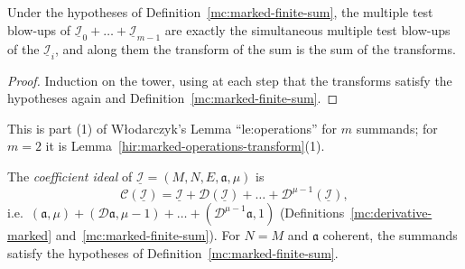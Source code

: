 \begin{lemma}
\label{mc:marked-finite-sum-tower}
\leanok
Under the hypotheses of Definition~\ref{mc:marked-finite-sum}, the multiple test blow-ups of \(\underline{\mathcal I}_0+\dots+\underline{\mathcal I}_{m-1}\) are exactly
the simultaneous multiple test blow-ups of the \(\underline{\mathcal I}_i\), and along them the transform of the sum is the sum of the transforms.
\end{lemma}
\begin{proof}
\leanok
Induction on the tower, using at each step that the transforms satisfy the hypotheses again and Definition~\ref{mc:marked-finite-sum}.
\end{proof}
This is part (1) of Włodarczyk's Lemma ``le:operations'' for \(m\) summands; for \(m=2\) it is Lemma~\ref{hir:marked-operations-transform}(1).

\begin{definition}
\label{mc:coefficient-ideal}
\leanok
The \emph{coefficient ideal} of \(\underline{\mathcal I}=(M,N,E,\mathfrak a,\mu)\) is
\[
 \mathcal C(\underline{\mathcal I})=\underline{\mathcal I}+\mathcal D(\underline{\mathcal I})+\dots+\mathcal D^{\mu-1}(\underline{\mathcal I}),
\]
i.e.\ \((\mathfrak a,\mu)+(\mathcal D\mathfrak a,\mu-1)+\dots+(\mathcal D^{\mu-1}\mathfrak a,1)\) (Definitions~\ref{mc:derivative-marked} and~\ref{mc:marked-finite-sum}).
For \(N=M\) and \(\mathfrak a\) coherent, the summands satisfy the hypotheses of Definition~\ref{mc:marked-finite-sum}.
\end{definition}

